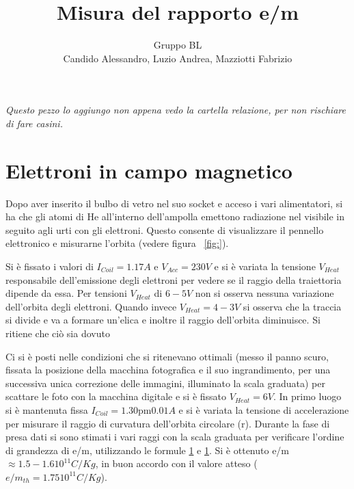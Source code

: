 \documentclass[10pt,a4paper]{article}
\title{Misura del rapporto e/m}
\author{Gruppo BL \\ Candido Alessandro, Luzio Andrea, Mazziotti Fabrizio}
\begin{document}
\maketitle

\emph{Questo pezzo lo aggiungo non appena vedo la cartella relazione, per non rischiare di fare casini.}
\section{Elettroni in campo magnetico}
Dopo aver inserito il bulbo di vetro nel suo socket e acceso i vari alimentatori, si ha che gli atomi di He all'interno dell'ampolla emettono radiazione nel visibile in seguito agli urti con gli elettroni. Questo consente di visualizzare il pennello elettronico e misurarne l'orbita (vedere figura \figurename{~\ref{fig:}}).

Si è fissato i valori di $I_{Coil} = \unit{1.17}{A}$ e $V_{Acc} = \unit{230}{V}$ e si è variata la tensione $V_{Heat}$ responsabile dell'emissione degli elettroni per vedere se il raggio della traiettoria dipende da essa.
Per tensioni $V_{Heat}$ di $\unit{6-5}{V}$ non si osserva nessuna variazione dell'orbita degli elettroni. Quando invece $V_{Heat} = \unit{4-3}{V}$ si osserva che la traccia si divide e va a formare un'elica e inoltre il raggio dell'orbita diminuisce. Si ritiene che ciò sia dovuto


Ci si è posti nelle condizioni che si ritenevano ottimali (messo il panno scuro, fissata la posizione della macchina fotografica e il suo ingrandimento, per una successiva unica correzione delle immagini, illuminato la scala graduata) per scattare le foto con la macchina digitale e si è fissato $V_{Heat} = \unit{6}{V}$. In primo luogo si è mantenuta fissa $I_{Coil} = \unit{1.30 \pm 0.01}{A}$
 e si è variata la tensione di accelerazione per misurare il raggio di curvatura dell'orbita circolare (r). Durante la fase di presa dati si sono stimati i vari raggi con la scala graduata per verificare l'ordine di grandezza di e/m, utilizzando le formule \ref{} e \ref{}. Si è ottenuto e/m $\approx \unit{1.5-1.6 10^{11}}{C/Kg}$, in buon accordo con il valore atteso ($e/m_{th} = \unit{1.75 10^{11}}{C/Kg}$).
\end{document}
